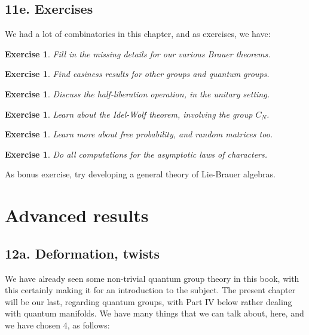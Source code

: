 \documentclass[12pt]{amsbook}
\newtheorem{exercise}[theorem]{Exercise}
\begin{document}
\section*{11e. Exercises}

We had a lot of combinatorics in this chapter, and as exercises, we have:

\begin{exercise}
Fill in the missing details for our various Brauer theorems.
\end{exercise}

\begin{exercise}
Find easiness results for other groups and quantum groups.
\end{exercise}

\begin{exercise}
Discuss the half-liberation operation, in the unitary setting.
\end{exercise}

\begin{exercise}
Learn about the Idel-Wolf theorem, involving the group $C_N$.
\end{exercise}

\begin{exercise}
Learn more about free probability, and random matrices too.
\end{exercise}

\begin{exercise}
Do all computations for the asymptotic laws of characters.
\end{exercise}

As bonus exercise, try developing a general theory of Lie-Brauer algebras.

\chapter{Advanced results}

\section*{12a. Deformation, twists}

We have already seen some non-trivial quantum group theory in this book, with this certainly making it for an introduction to the subject. The present chapter will be our last, regarding quantum groups, with Part IV below rather dealing with quantum manifolds. We have many things that we can talk about, here, and we have chosen 4, as follows:

\bigskip
\end{document}
